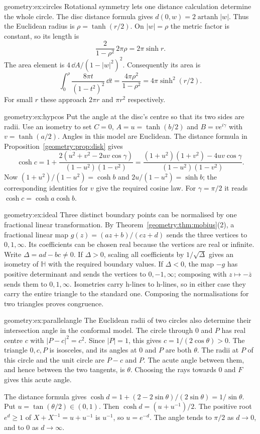 \begin{solution}{geometry:ex:circles}
\idea Rotational symmetry lets one distance calculation determine the
whole circle.
\writeup The disc distance formula gives $d(0,w)=2\operatorname{artanh}|w|$.
Thus the Euclidean radius is $\rho=\tanh(r/2)$.
On $|w|=\rho$ the metric factor is constant, so its length is
\[
 \frac{2}{1-\rho^2}\,2\pi\rho=2\pi\sinh r.
\]
The area element is $4\,\dd A/(1-|w|^2)^2$. Consequently its area is
\[
 \int_0^\rho\frac{8\pi t}{(1-t^2)^2}\,\dd t
 =\frac{4\pi\rho^2}{1-\rho^2}=4\pi\sinh^2(r/2).
\]
For small $r$ these approach $2\pi r$ and $\pi r^2$ respectively.
\end{solution}
\begin{solution}{geometry:ex:hypcos}
\idea Put the angle at the disc's centre so that its two sides are radii.
\writeup Use an isometry to set $C=0$, $A=u=\tanh(b/2)$ and
$B=ve^{i\gamma}$ with $v=\tanh(a/2)$. Angles in this model are Euclidean.
The distance formula in Proposition~\ref{geometry:prop:disk} gives
\[
 \cosh c=1+\frac{2(u^2+v^2-2uv\cos\gamma)}{(1-u^2)(1-v^2)}
 =\frac{(1+u^2)(1+v^2)-4uv\cos\gamma}{(1-u^2)(1-v^2)}.
\]
Now $(1+u^2)/(1-u^2)=\cosh b$ and $2u/(1-u^2)=\sinh b$;
the corresponding identities for $v$ give the required cosine law.
For $\gamma=\pi/2$ it reads $\cosh c=\cosh a\cosh b$.
\end{solution}
\begin{solution}{geometry:ex:ideal}
\idea Three distinct boundary points can be normalised by one fractional
linear transformation.
\writeup By Theorem~\ref{geometry:thm:mobius}(2), a fractional linear map
$g(z)=(az+b)/(cz+d)$ sends the three vertices to $0,1,\infty$.
Its coefficients can be chosen real because the vertices are real or
infinite. Write $\Delta=ad-bc\ne0$.
If $\Delta>0$, scaling all coefficients by $1/\sqrt\Delta$ gives an
isometry of $\mathbb H$ with the required boundary values.
If $\Delta<0$, the map $-g$ has positive determinant and sends the
vertices to $0,-1,\infty$; composing with $z\mapsto-\overline z$
sends them to $0,1,\infty$. Isometries carry h-lines to h-lines,
so in either case they carry the entire triangle to the standard one.
Composing the normalisations for two triangles proves congruence.
\end{solution}
\begin{solution}{geometry:ex:parallelangle}
\idea The Euclidean radii of two circles also determine their intersection
angle in the conformal model.
\writeup The circle through $0$ and $P$ has real centre $c$ with
$|P-c|^2=c^2$. Since $|P|=1$, this gives
$c=1/(2\cos\theta)>0$. The triangle $0,c,P$ is isosceles, and
its angles at $0$ and $P$ are both $\theta$.
The radii at $P$ of this circle and the unit circle are $P-c$ and $P$.
The acute angle between them, and hence between the two tangents, is
$\theta$. Choosing the rays towards $0$ and $F$ gives this acute angle.

The distance formula gives
$\cosh d=1+(2-2\sin\theta)/(2\sin\theta)=1/\sin\theta$.
Put $u=\tan(\theta/2)\in(0,1)$. Then
$\cosh d=(u+u^{-1})/2$.
The positive root $e^d\ge1$ of $X+X^{-1}=u+u^{-1}$ is $u^{-1}$,
so $u=e^{-d}$. The angle tends to $\pi/2$ as $d\to0$, and to $0$
as $d\to\infty$.
\end{solution}
